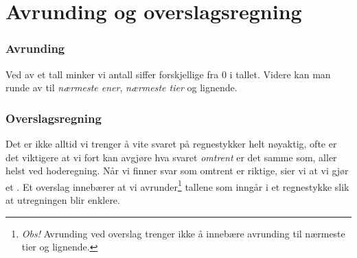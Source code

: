 \section{Avrunding og overslagsregning}

\subsubsection{Avrunding}
Ved  av et tall minker vi antall siffer forskjellige fra 0 i tallet. Videre kan man runde av til \textsl{nærmeste ener}, \textsl{nærmeste tier} og lignende.\regv
{}


\subsubsection{Overslagsregning}
Det er ikke alltid vi trenger å vite svaret på regnestykker helt nøyaktig, ofte er det viktigere at vi fort kan avgjøre hva svaret \textsl{omtrent} er det samme som, aller helst ved hoderegning. Når vi finner svar som omtrent er riktige, sier vi at vi gjør et . Et overslag innebærer at vi avrunder\footnote{\textit{Obs!} Avrunding ved overslag trenger ikke å innebære avrunding til nærmeste tier og lignende.} tallene som inngår i et regnestykke slik at utregningen blir enklere. \vsk


